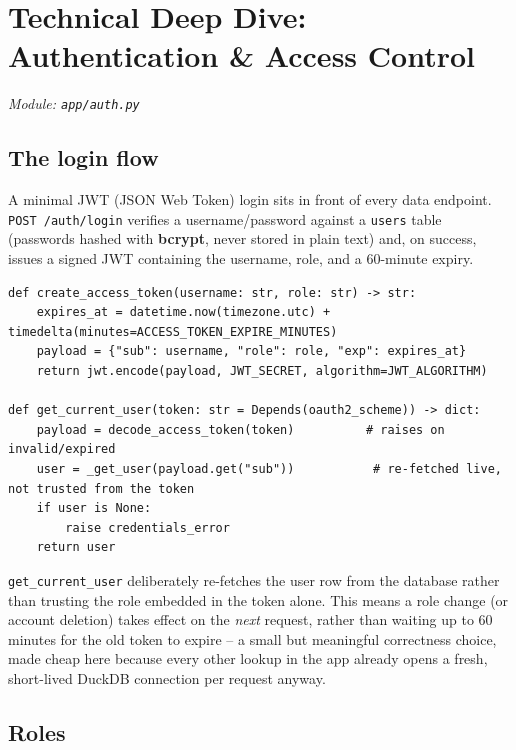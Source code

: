 \documentclass[11pt]{report}
\newcommand{\code}[1]{\lstinline[style=plain]!#1!}
\begin{document}
\chapter{Technical Deep Dive: Authentication \& Access Control}
\label{ch:auth}

\textit{Module: \texttt{app/auth.py}}

\section{The login flow}

A minimal JWT (JSON Web Token) login sits in front of every data endpoint. \code{POST /auth/login} verifies a username/password against a \code{users} table (passwords hashed with \textbf{bcrypt}, never stored in plain text) and, on success, issues a signed JWT containing the username, role, and a 60-minute expiry.

\begin{lstlisting}[style=py, caption={Token issuing and verification (\texttt{auth.py})}]
def create_access_token(username: str, role: str) -> str:
    expires_at = datetime.now(timezone.utc) + timedelta(minutes=ACCESS_TOKEN_EXPIRE_MINUTES)
    payload = {"sub": username, "role": role, "exp": expires_at}
    return jwt.encode(payload, JWT_SECRET, algorithm=JWT_ALGORITHM)

def get_current_user(token: str = Depends(oauth2_scheme)) -> dict:
    payload = decode_access_token(token)          # raises on invalid/expired
    user = _get_user(payload.get("sub"))           # re-fetched live, not trusted from the token
    if user is None:
        raise credentials_error
    return user
\end{lstlisting}

\begin{engbox}
\code{get_current_user} deliberately re-fetches the user row from the database rather than trusting the role embedded in the token alone. This means a role change (or account deletion) takes effect on the \emph{next} request, rather than waiting up to 60 minutes for the old token to expire -- a small but meaningful correctness choice, made cheap here because every other lookup in the app already opens a fresh, short-lived DuckDB connection per request anyway.
\end{engbox}

\section{Roles}
\end{document}
